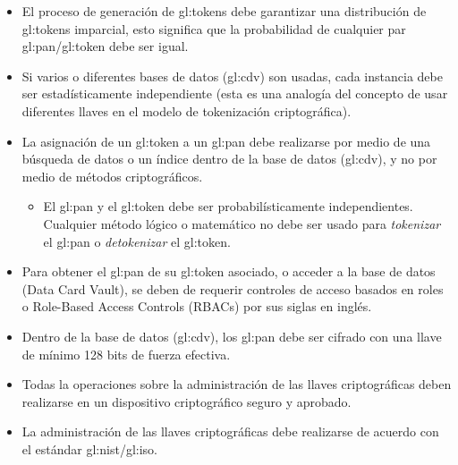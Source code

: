 \begin{itemize}
\begin{itemize}
    \end{itemize}

  \item El proceso de generación de \glspl{gl:token} debe garantizar una 
  distribución de \glspl{gl:token} imparcial, esto significa que la 
  probabilidad de cualquier par \gls{gl:pan}/\gls{gl:token} debe ser igual.

  \item Si varios o diferentes bases de datos (\acrlong{gl:cdv}) son usadas, 
  cada instancia debe ser estadísticamente independiente (esta es una analogía 
  del concepto de usar diferentes llaves en el modelo de tokenización 
  criptográfica).

  \item La asignación de un \gls{gl:token} a un \gls{gl:pan} debe realizarse 
  por medio de una búsqueda de datos o un índice dentro de la base de datos 
  (\acrlong{gl:cdv}), y no por medio de métodos criptográficos.

    \begin{itemize}
      
      \item El \gls{gl:pan} y el \gls{gl:token} debe ser probabilísticamente 
      independientes. Cualquier método lógico o matemático no debe ser usado 
      para \textit{tokenizar} el \gls{gl:pan} o \textit{detokenizar} el 
      \gls{gl:token}.

    \end{itemize}

  \item Para obtener el \gls{gl:pan} de su \gls{gl:token} asociado, o acceder 
  a la base de datos (Data Card Vault), se deben de requerir controles de 
  acceso basados en roles o Role-Based Access Controls (RBACs) por sus 
  siglas en inglés.

  \item Dentro de la base de datos (\acrlong{gl:cdv}), los \gls{gl:pan} debe 
  ser cifrado con una llave de mínimo 128 bits de fuerza efectiva.

  \item Todas la operaciones sobre la administración de las llaves 
  criptográficas deben realizarse en un dispositivo criptográfico seguro 
  y aprobado.

  \item La administración de las llaves criptográficas debe realizarse de 
  acuerdo con el estándar \gls{gl:nist}/\acrshort{gl:iso}. 

\end{itemize}

